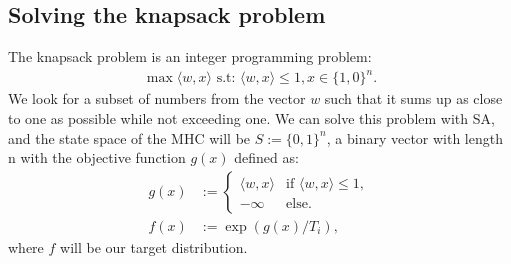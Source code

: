 \documentclass[]{article}
\theoremstyle{definition}
\begin{document}
\subsection{Solving the knapsack problem}
    The knapsack problem is an integer programming problem: 
    \begin{align*}
        \max \langle w, x\rangle \text{ s.t: } \langle w, x\rangle \le 1, x\in \{1, 0\}^n. 
    \end{align*}
    We look for a subset of numbers from the vector $w$ such that it sums up as close to one as possible while not exceeding one. We can solve this problem with SA, and the state space of the MHC will be $S:= \{0, 1\}^n$, a binary vector with length n with the objective function $g(x)$ defined as: 
    \begin{align*}
        g(x) &:= \begin{cases}
            \langle w, x\rangle & \text{if }\langle w, x\rangle\le 1,
            \\
            -\infty & \text{else}. 
        \end{cases}
        \\
        f(x) &:= \exp(g(x)/T_i), 
    \end{align*}
    where $f$ will be our target distribution. 
\end{document}
